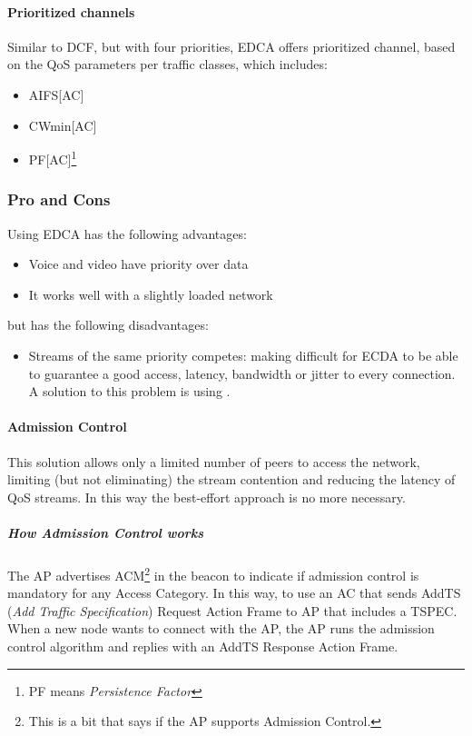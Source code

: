 \paragraph*{Prioritized channels} Similar to DCF, but with four priorities, EDCA
offers prioritized channel, based on the QoS parameters per traffic classes,
which includes:
\begin{itemize}
\item AIFS[AC]
\item CWmin[AC]
\item PF[AC]\footnote{PF means \textit{Persistence Factor}}
\end{itemize}

\subsubsection{Pro and Cons}

Using EDCA has the following advantages:
\begin{itemize}
\item Voice and video have priority over data
\item It works well with a slightly loaded network
\end{itemize}
but has the following disadvantages:
\begin{itemize}
\item Streams of the same priority competes: making difficult for ECDA to be
able to guarantee a good access, latency, bandwidth or jitter to every
connection. A solution to this problem is using
.
\end{itemize}

\paragraph*{Admission Control} This solution allows only a limited number of
peers to access the network, limiting (but not eliminating) the stream
contention and reducing the latency of QoS streams.
In this way the best-effort approach is no more necessary.
\subparagraph*{How Admission Control works} The AP advertises ACM\footnote{This
is a bit that says if the AP supports Admission Control.} in the beacon to
indicate if admission control is mandatory for any Access Category. In this way,
to use an AC that  sends AddTS (\textit{Add Traffic Specification}) Request
Action Frame to AP that includes a TSPEC.
When a new node wants to connect with the AP, the AP runs the admission control
algorithm and replies with an AddTS Response Action Frame.


